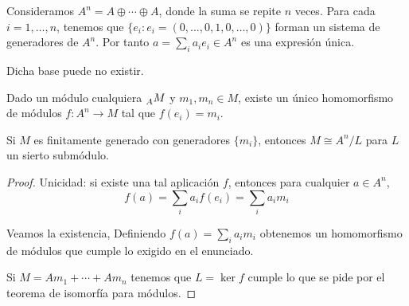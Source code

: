 \begin{df}
  Consideramos \(A^n=A\oplus\cdots\oplus A\), donde la suma se repite
  \(n\) veces. Para cada \(i=1,\ldots, n\), tenemos que
  \(\{e_i: e_i=(0,\ldots, 0,1,0, \ldots, 0)\}\) forman un sistema de
  generadores de \(A^n\). Por tanto \(a=\sum_i a_i e_i\in A^n\)
  es una expresión única.
\end{df}

Dicha base puede no existir.

\begin{prop}
  Dado un módulo cualquiera \(\prescript{}{A}{M}\) y \(m_1, m_n\in M\),
  existe un único homomorfismo de módulos \(f:A^n\longrightarrow M\)
  tal que \(f(e_i)=m_i\).
\end{prop}

\begin{cor}
  Si \(M\) es finitamente generado con generadores \(\{m_i\}\),
  entonces \(M\cong A^n/L\) para \(L\) un sierto submódulo.
\end{cor}

\begin{proof}
  Unicidad: si existe una tal aplicación \(f\), entonces para
  cualquier \(a\in A^n\),
  \[
    f(a)=\sum_i a_i f(e_i)=\sum_i a_i m_i
  \]

  Veamos la existencia,
  Definiendo \(f(a)=\sum_i a_i m_i\) obtenemos un homomorfismo de módulos
  que cumple lo exigido en el enunciado.

  Si \(M=Am_1+\cdots+Am_n\) tenemos que \(L=\ker f\) cumple lo que se
  pide por el teorema de isomorfía para módulos.
\end{proof}

